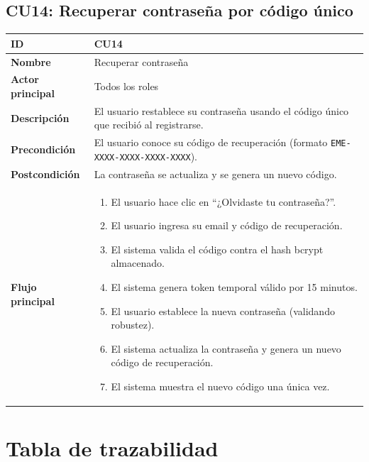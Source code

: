 \documentclass[11pt,a4paper]{article}
\begin{document}
\subsection*{CU14: Recuperar contraseña por código único}
\begin{longtable}{|L{3.5cm}|L{10cm}|}
    \hline
    \textbf{ID}              & CU14                                                                                    \\ \hline
    \textbf{Nombre}          & Recuperar contraseña                                                                    \\ \hline
    \textbf{Actor principal} & Todos los roles                                                                         \\ \hline
    \textbf{Descripción}     & El usuario restablece su contraseña usando el código único que recibió al registrarse.  \\ \hline
    \textbf{Precondición}    & El usuario conoce su código de recuperación (formato \texttt{EME-XXXX-XXXX-XXXX-XXXX}). \\ \hline
    \textbf{Postcondición}   & La contraseña se actualiza y se genera un nuevo código.                                 \\ \hline
    \textbf{Flujo principal} &
    \begin{enumerate}
        \item El usuario hace clic en ``¿Olvidaste tu contraseña?''.
        \item El usuario ingresa su email y código de recuperación.
        \item El sistema valida el código contra el hash bcrypt almacenado.
        \item El sistema genera token temporal válido por 15 minutos.
        \item El usuario establece la nueva contraseña (validando robustez).
        \item El sistema actualiza la contraseña y genera un nuevo código de recuperación.
        \item El sistema muestra el nuevo código una única vez.
    \end{enumerate}                              \\ \hline
\end{longtable}

\section{Tabla de trazabilidad}
\end{document}
